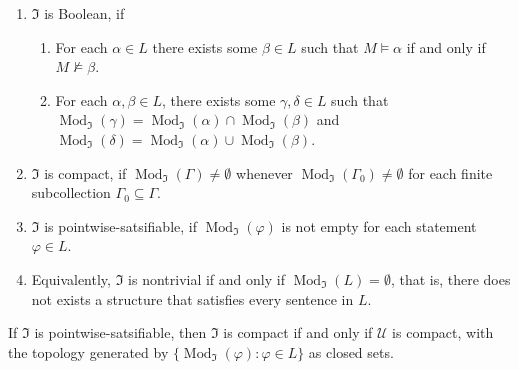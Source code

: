 \documentclass{treatise}
\begin{document}
\begin{shaded}
\begin{enumerate}
    \item $\mathfrak{I}$ is Boolean, if
    \begin{enumerate}
        \item For each $\alpha \in L$ there exists some $\beta \in L$ such that $M \vDash \alpha$ if and only if $M \not\vDash \beta$.
	\item For each $\alpha,\beta \in L$, there exists some $\gamma, \delta \in L$ such that $\operatorname{Mod}_\mathfrak{I} (\gamma) = \operatorname{Mod}_\mathfrak{I} (\alpha) \cap \operatorname{Mod}_\mathfrak{I} (\beta)$ and $\operatorname{Mod}_\mathfrak{I} (\delta) = \operatorname{Mod}_\mathfrak{I} (\alpha) \cup \operatorname{Mod}_\mathfrak{I} (\beta)$.
    \end{enumerate}
	    \item $\mathfrak{I}$ is compact, if $\operatorname{Mod}_\mathfrak{I} (\Gamma) \neq \emptyset$ whenever $\operatorname{Mod}_\mathfrak{I} (\Gamma_0) \neq \emptyset$ for each finite subcollection $\Gamma_0 \subseteq \Gamma$.
    \item $\mathfrak{I}$ is pointwise-satsifiable, if $\operatorname{Mod}_\mathfrak{I}(\varphi)$ is not empty for each statement $\varphi \in L$.
    \item Equivalently, $\mathfrak{I}$ is nontrivial if and only if $\operatorname{Mod}_{\mathfrak{I}}(L) = \emptyset$, that is, there does not exists a structure that satisfies every sentence in $L$.
\end{enumerate}
\begin{remark}
If $\mathfrak{I}$ is pointwise-satsifiable, then $\mathfrak{I}$ is compact if and only if $\mathcal{U}$ is compact, with the topology generated by $\{ \operatorname{Mod}_\mathfrak{I} (\varphi) : \varphi \in L \}$ as closed sets.
\end{remark}

\newpage


\end{shaded}
\end{document}
